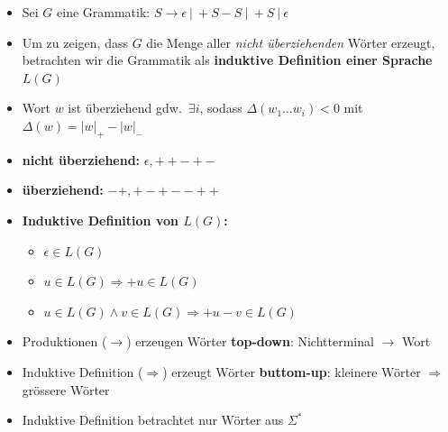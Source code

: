 \documentclass[ieeetran]{article}
\begin{document}
\begin{itemize}
  \item Sei $G$ eine Grammatik: $S \rightarrow \epsilon \ | \ +S-S \ | \ +S \ | \ \epsilon$ 
\item Um zu zeigen, dass $G$ die Menge aller \textit{nicht überziehenden} Wörter erzeugt, betrachten wir die Grammatik als \textbf{induktive Definition einer Sprache $L(G)$}

\item Wort $w$ ist überziehend gdw.\ $\exists i$, sodass $\Delta (w_1 \ldots w_i) < 0$ mit $\Delta(w) = |w|_+ - |w|_-$

\item \textbf{nicht überziehend:} $\epsilon, ++-+-$
\item \textbf{überziehend:} $-+, +-+--++$
\item \textbf{Induktive Definition von $L(G)$:}
\begin{itemize}
  \item $\epsilon \in L(G)$
  \item $u \in L(G) \Longrightarrow +u \in L(G)$
\item $u \in L(G) \land v \in L(G) \Longrightarrow +u-v \in L(G)$
\end{itemize}	

\item Produktionen ($\rightarrow$) erzeugen Wörter \textbf{top-down}: Nichtterminal $\rightarrow$ Wort
\item Induktive Definition ($\Longrightarrow$) erzeugt Wörter \textbf{buttom-up}: kleinere Wörter $\Longrightarrow$ grössere Wörter
\item Induktive Definition betrachtet nur Wörter aus $\Sigma^*$

\end{itemize}

\pagebreak
\end{document}
